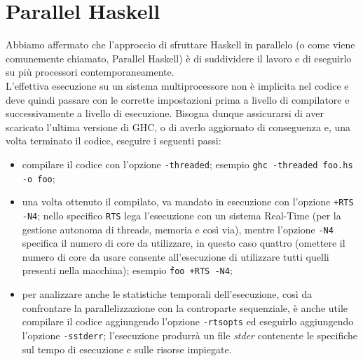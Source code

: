 \chapter{Parallel Haskell}
Abbiamo affermato che l'approccio di sfruttare Haskell in parallelo (o come viene comunemente chiamato, Parallel Haskell) è di suddividere il lavoro e di eseguirlo su più processori contemporaneamente.\\
L'effettiva esecuzione su un sistema multiprocessore non è implicita nel codice e deve quindi passare con le corrette impostazioni prima a livello di compilatore e successivamente a livello di esecuzione. Bisogna dunque assicurarsi di aver scaricato l'ultima versione di GHC, o di averlo aggiornato di conseguenza e, una volta terminato il codice, eseguire i seguenti passi:
\begin{itemize}
\item{compilare il codice con l'opzione \texttt{-threaded}; esempio \texttt{ghc -threaded foo.hs -o foo};}
\item{una volta ottenuto il compilato, va mandato in esecuzione con l'opzione \texttt{+RTS -N4}; nello specifico \texttt{RTS} lega l'esecuzione con un sistema Real-Time (per la gestione autonoma di threads, memoria e così via), mentre l'opzione \texttt{-N4} specifica il numero di core da utilizzare, in questo caso quattro (omettere il numero di core da usare consente all'esecuzione di utilizzare tutti quelli presenti nella macchina); esempio \texttt{\.foo +RTS -N4};}
\item{per analizzare anche le statistiche temporali dell'esecuzione, così da confrontare la parallelizzazione con la controparte sequenziale, è anche utile compilare il codice aggiungendo l'opzione \texttt{-rtsopts} ed eseguirlo aggiungendo l'opzione \texttt{-sstderr}; l'esecuzione produrrà un file \textit{stder} contenente le specifiche sul tempo di esecuzione e sulle risorse impiegate.}
\end{itemize}
